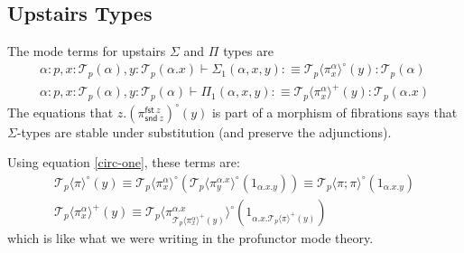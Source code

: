 \documentclass[10pt]{article}
\theoremstyle{definition}
\newcommand\dsd[1]{\ensuremath{\mathsf{#1}}}
\newcommand{\yields}{\vdash}
\newcommand\TrPlus[2]{\ensuremath{{#1}^+(#2)}}
\newcommand\TrCirc[2]{\ensuremath{{#1}^\circ(#2)}}
\newcommand{\id}{\mathsf{id}}
\newcommand\El[2]{\mathcal{T}_{#1}(#2)}
\newcommand\ApEl[2]{\mathcal{T}_{#1}\langle#2\rangle}
\newcommand\ap[2]{\ensuremath{#1 \langle #2 \rangle }}
\newcommand{\app}[2]{\ensuremath{#1 \: #2}}
\newcommand{\fst}[1]{\app{\dsd{fst}}{#1}}
\newcommand{\snd}[1]{\app{\dsd{snd}}{#1}}
\begin{document}

\subsection{Upstairs Types}

The mode terms for upstairs $\Sigma$ and $\Pi$ types are
\begin{align*}
\alpha : p, x : \El{p}{\alpha}, y : \El{p}{\alpha.x} \yields \Sigma_1(\alpha,x,y) :\equiv \TrCirc{\ApEl{p}{\pi^\alpha_x}}{y}  : \El{p}{\alpha}\\
\alpha : p, x : \El{p}{\alpha}, y : \El{p}{\alpha} \yields \Pi_1(\alpha,x,y) :\equiv \TrPlus{\ApEl{p}{\pi^\alpha_x}}{y} : \El{p}{\alpha.x}
\end{align*}
The equations that $z.\TrCirc{(\pi^{\fst z}_{\snd{z}})}{y}$ is part of a
morphism of fibrations says that $\Sigma$-types are stable under
substitution (and preserve the adjunctions).

Using equation \eqref{circ-one}, these terms are:
\begin{align*}
\ApEl{p}{\pi}^\circ(y) \equiv \ApEl{p}{\pi^\alpha_x}^\circ(\ApEl{p}{\pi^{\alpha.x}_y}^\circ(1_{\alpha.x.y})) \equiv \ApEl{p}{\pi;\pi}^\circ(1_{\alpha.x.y}) \\
\ApEl{p}{\pi^\alpha_x}^+(y) \equiv \ApEl{p}{\pi^{\alpha.x}_{\ApEl{p}{\pi^\alpha_x}^+(y)}}^\circ(1_{\alpha.x.\ApEl{p}{\pi}^+(y)})
\end{align*}
which is like what we were writing in the profunctor mode theory.  
\end{document}
